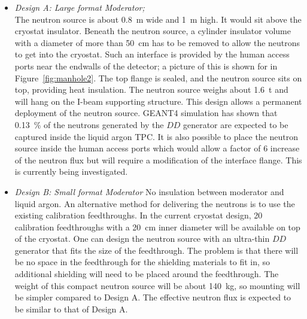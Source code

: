 \begin{itemize}
\item {\it Design A: Large format Moderator;} \\
The neutron source is about \SI{0.8}{\m} wide and \SI{1}{\m} high. It would sit above the cryostat insulator. Beneath the neutron source, a cylinder insulator volume with a diameter of more than \SI{50}{\cm} has to be removed to allow the neutrons to get into the cryostat. Such an interface is provided by the human access ports near the endwalls of the detector; a picture of this is shown for  in Figure~\ref{fig:manhole2}. The top flange is sealed, and the neutron source sits on top, 
providing heat insulation. The neutron source weighs about \SI{1.6}{\tonne} and will hang on the I-beam supporting structure. This design allows a permanent deployment of the neutron source. GEANT4 simulation has shown that \SI{0.13}{\%} of the neutrons generated by the $DD$ generator are expected to be captured inside the liquid argon TPC. It is also possible to place the neutron source inside the human access ports which would allow a factor of \num{6} increase of the neutron flux but will require a modification of the interface flange. This is currently being investigated.

\item \textit{Design B: Small format Moderator} %
No insulation between moderator and liquid argon. An alternative method for delivering the neutrons is to use the existing calibration feedthroughs. In the current cryostat design, \num{20} calibration feedthroughs with a \SI{20}{\cm} inner diameter will be available on top of the cryostat. One can design the neutron source with an ultra-thin $DD$ generator that fits the size of the feedthrough. The problem is that there will be no space in the feedthrough for the shielding materials to fit in, so additional shielding will need to be placed around the feedthrough. The weight of this compact neutron source will be about \SI{140}{\kg}, so mounting will be simpler compared to Design A. The effective neutron flux is expected to be similar to that of Design A. 
\end{itemize}

